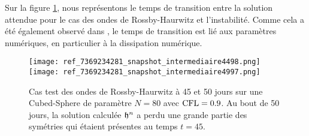 Sur la figure \ref{fig: rossby 4550}, nous représentons le temps de transition entre la solution attendue pour le cas des ondes de Rossby-Haurwitz et l'instabilité. Comme cela a été également observé dans \cite{Ullrich2011, Ullrich2010}, le temps de transition est lié aux paramètres numériques, en particulier à la dissipation numérique.

\begin{figure}[htbp]
\begin{center}
\texttt{[image: ref\_7369234281\_snapshot\_intermediaire4498.png]}
\texttt{[image: ref\_7369234281\_snapshot\_intermediaire4997.png]}
\end{center}
\caption{Cas test des ondes de Rossby-Haurwitz à 45 et 50 jours sur une Cubed-Sphere de paramètre $N=80$ avec $\text{CFL}=0.9$. Au bout de 50 jours, la solution calculée $\mathfrak{h}^n$ a perdu une grande partie des symétries qui étaient présentes au temps $t=45$.}
\label{fig: rossby 4550}
\end{figure}